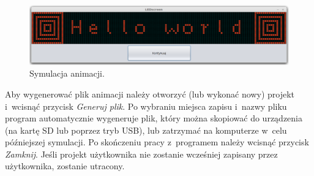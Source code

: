 \begin{figure}[htb]
	\begin{center}
		\includegraphics[width=\textwidth]{figures/simulation.png}
	\end{center}
	\caption{Symulacja animacji.}
	\label{ani-sym}
\end{figure}

Aby wygenerować plik animacji należy otworzyć (lub wykonać nowy) projekt i~wcisnąć przycisk \textit{Generuj plik}. Po wybraniu miejsca zapisu i~nazwy pliku program automatycznie wygeneruje plik, który można skopiować do urządzenia (na kartę SD lub poprzez tryb USB), lub zatrzymać na komputerze w~celu późniejszej symulacji. Po skończeniu pracy z~programem należy wcisnąć przycisk \textit{Zamknij}. Jeśli projekt użytkownika nie zostanie wcześniej zapisany przez użytkownika, zostanie utracony.


